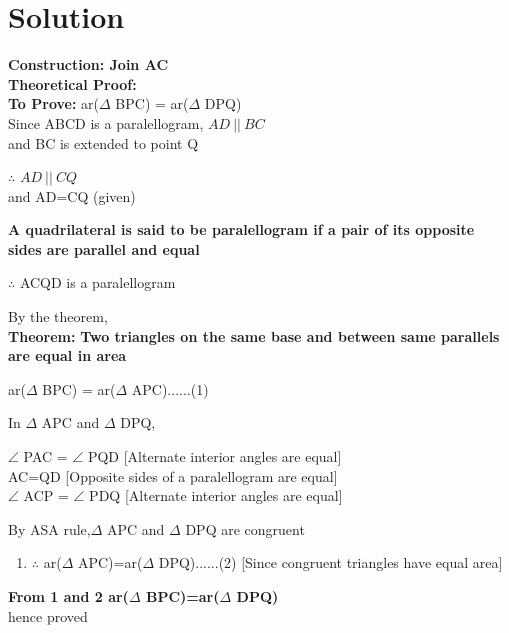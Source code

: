 \documentclass[journal,12pt,twocolumn]{IEEEtran}
\begin{document}
\section{Solution}
\justify
\textbf{Construction: Join AC}\\
\textbf{Theoretical Proof:}\\
\textbf{To Prove:}
ar($\Delta$ BPC) = ar($\Delta$ DPQ)\\
Since ABCD is a paralellogram, $ AD \: || \: BC $\\
and BC is extended to point Q\\
\begin{enumerate}
$\therefore$ $ AD \: || \: CQ $\\ and AD=CQ  (given)\\
\end{enumerate}
\textbf{A quadrilateral is said to be paralellogram if a pair of its opposite sides are parallel and equal}\\
\begin{enumerate}
$\therefore$ ACQD is a paralellogram\\
\end{enumerate}
By the theorem,\\
\textbf{Theorem:}
\textbf{Two triangles on the same base and between same parallels are equal in area}\\
\begin{enumerate}
ar($\Delta$ BPC) = ar($\Delta$ APC)......(1)\\
\end{enumerate}
In $\Delta$ APC and $\Delta$ DPQ,\\
\begin{enumerate}
$\angle$ PAC = $\angle$ PQD [Alternate interior angles are equal]\\ 
AC=QD [Opposite sides of a paralellogram are equal]\\
$\angle$ ACP = $\angle$ PDQ [Alternate interior angles are equal]\\
\end{enumerate}
By ASA rule,$\Delta$ APC and $\Delta$ DPQ are congruent\\
\begin{enumerate}
\item $\therefore$ ar($\Delta$ APC)=ar($\Delta$ DPQ)......(2) [Since congruent triangles have equal area]\\
\end{enumerate}
\textbf{From 1 and 2 ar($\Delta$ BPC)=ar($\Delta$ DPQ)}\\
hence proved\\
\end{document}
